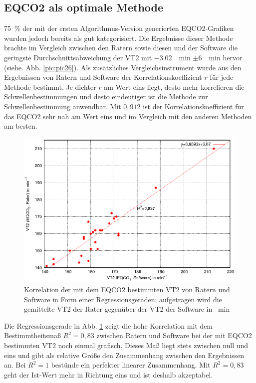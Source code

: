 \subsection{\gls{EQCO2} als optimale Methode}
%
75~\% der mit der ersten Algorithmus-Version generierten \gls{EQCO2}-Grafiken wurden jedoch bereits als gut kategorisiert. Die Ergebnisse dieser Methode brachte im Vergleich zwischen den Ratern sowie diesen und der Software die geringste Durchschnittsabweichung der VT2 mit \SI{-3,02}{\per\minute} $\pm$\SI{6}{\per\minute} hervor (siehe. Abb. \ref{pic:pic26}). Als zusätzliches Vergleichsinstrument wurde aus den Ergebnissen von Ratern und Software der Korrelationskoeffizient $r$ für jede Methode bestimmt. Je dichter $r$ am Wert eins liegt, desto mehr korrelieren die Schwellenbestimmungen und desto eindeutiger ist die Methode zur Schwellenbestimmung anwendbar. Mit $0,912$ ist der Korrelationskoeffizient für das \gls{EQCO2} sehr nah am Wert eins und im Vergleich mit den anderen Methoden am besten.
%
\begin{figure}[H]
	\centering
	\includegraphics[scale=0.95]{Bilder/korr_eqco2.eps}
	\caption[Korrelation der \gls{EQCO2}-Werte von Ratern und Software]{Korrelation der mit dem \gls{EQCO2} bestimmten VT2 von Ratern und Software in Form einer Regressionsgeraden; aufgetragen wird die gemittelte VT2 der Rater gegenüber der VT2 der Software in \si{\per\minute}}
	\label{pic:pic28}
\end{figure}
%
Die Regressionsgerade in Abb. \ref{pic:pic28} zeigt die hohe Korrelation mit dem Bestimmtheitsmaß $R^2 = 0,83$ zwischen Ratern und Software bei der mit \gls{EQCO2} bestimmten VT2 noch einmal grafisch. Dieses Maß liegt stets zwischen null und eins und gibt als relative Größe den Zusammenhang zwischen den Ergebnissen an. Bei $R^2 = 1$ bestünde ein perfekter linearer Zusammenhang. Mit $R^2 = 0,83$ geht der Ist-Wert mehr in Richtung eins und ist deshalb akzeptabel.\\
